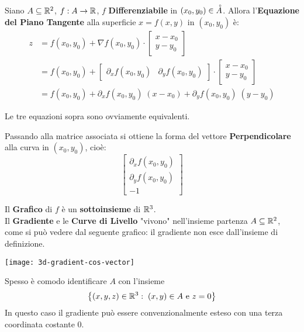 \begin{definition}
	Siano $A \subseteq \mathbb{R}^2$, $f: A \to \mathbb{R}$, $f$ \textbf{Differenziabile} in $(x_0, y_0) \in \accentset{\circ}{A}$. Allora l'\textbf{Equazione del Piano Tangente} alla superficie $x = f(x,y)$ in $(x_0, y_0)$ è:
	\begin{align*}
		z &= f(x_0, y_0) +
		\nabla f(x_0, y_0) \cdot
		\begin{bmatrix}
			x - x_0\\
			y - y_0
		\end{bmatrix}\\
		&= f(x_0, y_0) +
		\begin{bmatrix}
			\partial_xf(x_0,y_0) & \partial_yf(x_0,y_0)
		\end{bmatrix}
		\cdot
		\begin{bmatrix}
			x - x_0\\
			y - y_0
		\end{bmatrix}\\
		&= f(x_0, y_0) + \partial_xf(x_0,y_0) \; (x - x_0) + \partial_yf(x_0,y_0) \; (y - y_0)
	\end{align*}
	\vspace*{-\baselineskip}
	\begin{note}
		Le tre equazioni sopra sono ovviamente equivalenti.
	\end{note}
	Passando alla matrice associata si ottiene la forma del vettore \textbf{Perpendicolare} alla curva in $(x_0, y_0)$, cioè:
	\[
		\begin{bmatrix}
			\partial_x f(x_0, y_0)\\
			\partial_y f(x_0, y_0)\\
			-1
		\end{bmatrix}
	\]
\end{definition}

\begin{observation}
	Il \textbf{Grafico} di $f$ è un \textbf{sottoinsieme} di $\mathbb{R}^3$.\\
	Il \textbf{Gradiente} e le \textbf{Curve di Livello} "vivono" nell'insieme partenza $A \subseteq \mathbb{R}^2$, come si può vedere dal seguente grafico: il gradiente non esce dall'insieme di definizione.
	\begin{center}
		\texttt{[image: 3d-gradient-cos-vector]} %
	\end{center}
	Spesso è comodo identificare $A$ con l'insieme
	\[\left\{(x,y,z) \in \mathbb{R}^3:\; (x,y) \in A \text{ e } z = 0\right\}\]
	In questo caso il gradiente può essere convenzionalmente esteso con una terza coordinata costante $0$.
\end{observation}

